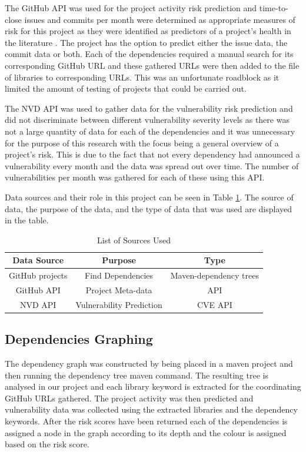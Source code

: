\documentclass[conference]{IEEEtran}
\begin{document}
The GitHub API was used for the project activity risk prediction and time-to-close issues and commits per month were determined as appropriate measures of risk for this project as they were identified as predictors of a project's health in the literature \cite{xia_predicting_2022}. The project has the option to predict either the issue data, the commit data or both. Each of the dependencies required a manual search for its corresponding GitHub URL and these gathered URLs were then added to the file of libraries to corresponding URLs. This was an unfortunate roadblock as it limited the amount of testing of projects that could be carried out. 

The NVD API was used to gather data for the vulnerability risk prediction and did not discriminate between different vulnerability severity levels as there was not a large quantity of data for each of the dependencies and it was unnecessary for the purpose of this research with the focus being a general overview of a project's risk. This is due to the fact that not every dependency had announced a vulnerability every month and the data was spread out over time.  The number of vulnerabilities per month was gathered for each of these using this API. 

Data sources and their role in this project can be seen in Table \ref{sourcelist}. The source of data, the purpose of the data, and the type of data that was used are displayed in the table. 

\begin{table}
 \caption{List of Sources Used}
\label{sourcelist}
\begin{center}
\begin{tabular}{|c|c|c|}
\hline
    \textbf{Data Source} & \textbf{Purpose} & \textbf{Type} \\ \hline
    GitHub projects & Find Dependencies & Maven-dependency trees \\ \hline
    GitHub API & Project Meta-data & API  \\ \hline
    NVD API & Vulnerability Prediction & CVE API \\ \hline
\end{tabular}
\end{center}
\end{table}

\subsection{Dependencies Graphing}
The dependency graph was constructed by being placed in a maven project and then running the dependency tree maven command. The resulting tree is analysed in our project and each library keyword is extracted for the coordinating GitHub URLs gathered. The project activity was then predicted and vulnerability data was collected using the extracted libraries and the dependency keywords. After the risk scores have been returned each of the dependencies is assigned a node in the graph according to its depth and the colour is assigned based on the risk score.
\end{document}
